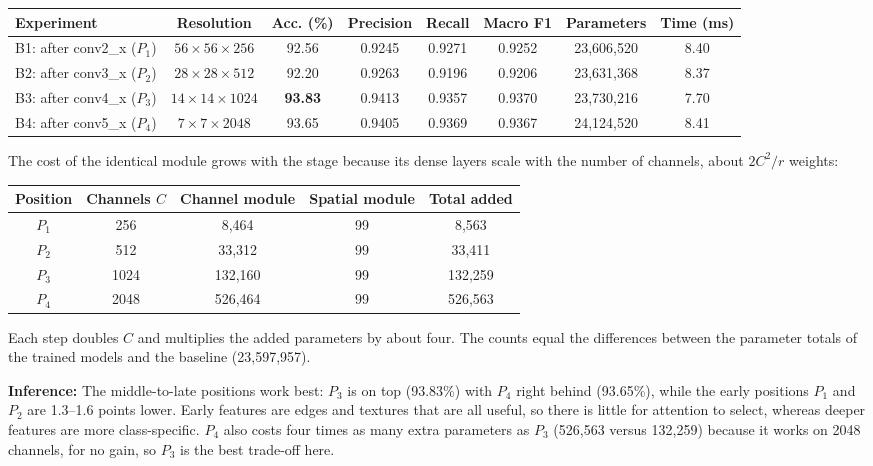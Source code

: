 \documentclass[11pt]{article}
\begin{document}
\begin{center}
\small
\begin{tabular}{|l|c|c|c|c|c|c|c|}
\hline
Experiment & Resolution & Acc. (\%) & Precision & Recall & Macro F1 & Parameters & Time (ms)\\
\hline
B1: after conv2\_x ($P_1$) & $56\times56\times256$ & 92.56 & 0.9245 & 0.9271 & 0.9252 & 23{,}606{,}520 & 8.40\\
B2: after conv3\_x ($P_2$) & $28\times28\times512$ & 92.20 & 0.9263 & 0.9196 & 0.9206 & 23{,}631{,}368 & 8.37\\
B3: after conv4\_x ($P_3$) & $14\times14\times1024$ & \textbf{93.83} & 0.9413 & 0.9357 & 0.9370 & 23{,}730{,}216 & 7.70\\
B4: after conv5\_x ($P_4$) & $7\times7\times2048$ & 93.65 & 0.9405 & 0.9369 & 0.9367 & 24{,}124{,}520 & 8.41\\
\hline
\end{tabular}
\end{center}

\medskip
The cost of the identical module grows with the stage because its dense
layers scale with the number of channels, about $2C^2/r$ weights:

\begin{center}
\small
\begin{tabular}{|c|c|c|c|c|}
\hline
Position & Channels $C$ & Channel module & Spatial module & Total added\\
\hline
$P_1$ & 256 & 8{,}464 & 99 & 8{,}563\\
$P_2$ & 512 & 33{,}312 & 99 & 33{,}411\\
$P_3$ & 1024 & 132{,}160 & 99 & 132{,}259\\
$P_4$ & 2048 & 526{,}464 & 99 & 526{,}563\\
\hline
\end{tabular}
\end{center}

Each step doubles $C$ and multiplies the added parameters by about four. The
counts equal the differences between the parameter totals of the trained
models and the baseline (23{,}597{,}957).

\textbf{Inference:} The middle-to-late positions work best: $P_3$ is on top
(93.83\%) with $P_4$ right behind (93.65\%), while the early positions $P_1$
and $P_2$ are 1.3--1.6 points lower. Early features are edges and textures
that are all useful, so there is little for attention to select, whereas
deeper features are more class-specific. $P_4$ also costs four times as
many extra parameters as $P_3$ (526{,}563 versus 132{,}259) because it
works on 2048 channels, for no gain, so $P_3$ is the best trade-off here.
\end{document}
